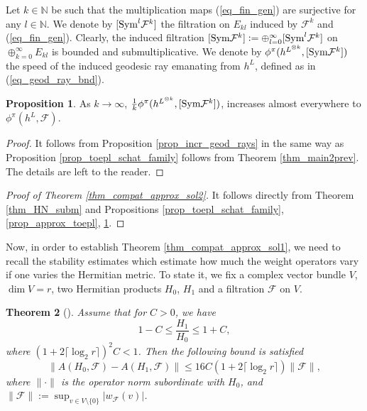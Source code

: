 \documentclass[12pt]{article}
\numberwithin{equation}{section}
\theoremstyle{theorem}
\newtheorem{thm}{Theorem}[section]
\theoremstyle{definition}
\newtheorem{prop}[thm]{Proposition}
\theoremstyle{remark}
\newcommand{\nat}{\mathbb{N}}
\begin{document}
	\par 
	Let $k \in \nat$ be such that the multiplication maps (\ref{eq_fin_gen}) are surjective for any $l \in \nat$. 
	We denote by $[{\rm{Sym}}^l \mathcal{F}^k]$ the filtration on $E_{kl}$ induced by $\mathcal{F}^k$ and (\ref{eq_fin_gen}).
	Clearly, the induced filtration $[{\rm{Sym}} \mathcal{F}^k] := \oplus_{l = 0}^{\infty} [{\rm{Sym}}^l \mathcal{F}^k]$ on $\oplus_{k = 0}^{\infty} E_{kl}$ is bounded and submultiplicative.
	We denote by $\phi^{\pi}(h^{L^{\otimes k}}, [{\rm{Sym}} \mathcal{F}^k])$ the speed of the induced geodesic ray emanating from $h^L$, defined as in (\ref{eq_geod_ray_bnd}).
	\begin{prop}\label{prop_incr_geod_rays_fam}
		As $k \to \infty$, $\frac{1}{k} \phi^{\pi}(h^{L^{\otimes k}}, [{\rm{Sym}} \mathcal{F}^k])$, increases almost everywhere to $\phi^{\pi}(h^L, \mathcal{F})$.
	\end{prop}
	\begin{proof}
		It follows from Proposition \ref{prop_incr_geod_rays} in the same way as Proposition \ref{prop_toepl_schat_family} follows from Theorem \ref{thm_main2prev}. The details are left to the reader.
	\end{proof}
	
	\begin{proof}[Proof of Theorem \ref{thm_compat_approx_sol2}]
		It follows directly from Theorem \ref{thm_HN_subm} and Propositions \ref{prop_toepl_schat_family}, \ref{prop_approx_toepl}, \ref{prop_incr_geod_rays_fam}.
	\end{proof}
	
	\par 
	Now, in order to establish Theorem \ref{thm_compat_approx_sol1}, we need to recall the stability estimates which estimate how much the weight operators vary if one varies the Hermitian metric.
	To state it, we fix a complex vector bundle $V$, $\dim V = r$, two Hermitian products $H_0$, $H_1$ and a filtration $\mathcal{F}$ on $V$.
	\begin{sloppypar}
	\begin{thm}[{\cite[Theorem 6.5]{FinSubmToepl}}]\label{thm_cholesky}
		Assume that for $C > 0$, we have
		\begin{equation}\label{eqthm_cholesky}
			1 - C
			\leq 
			\frac{H_1}{H_0} 
			\leq
			1 + C,
		\end{equation}
		where $(1 + 2 \lceil \log_2 r \rceil)^2 C < 1$.
		Then the following bound is satisfied 
		\begin{equation}
			\Big\| 
				A(H_0, \mathcal{F}) - A(H_1, \mathcal{F})
			\Big\|
			\leq
			16  C  (1 + 2 \lceil \log_2 r \rceil) \| \mathcal{F} \|,
		\end{equation}
		where $\| \cdot \|$ is the operator norm subordinate with $H_0$, and $\| \mathcal{F} \| := \sup_{v \in V \setminus \{0\}} |w_{\mathcal{F}}(v)|$.
	\end{thm}
	\end{sloppypar}
	
\end{document}
